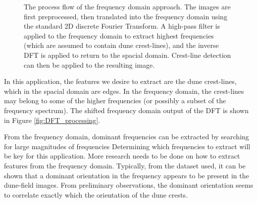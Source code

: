  \begin{figure}[H]
 	\centering
 	\caption{The process flow of the frequency domain approach. The images are first preprocessed, then translated into the frequency domain using the standard 2D discrete Fourier Transform. A high-pass filter is applied to the frequency domain to extract highest frequencies (which are assumed to contain dune crest-lines), and the inverse DFT is applied to return to the spacial domain. Crest-line detection can then be applied to the resulting image. }
 	\label{fig:flow_dft}
 \end{figure}

In this application, the features we desire to extract are the dune crest-lines, which in the spacial domain are edges. In the frequency domain, the crest-lines may belong to some of the higher frequencies (or possibly a subset of the frequency spectrum). The shifted frequency domain output of the DFT is shown in Figure \ref{fig:DFT_processing}.

From the frequency domain, dominant frequencies can be extracted by searching for large magnitudes of frequencies Determining which frequencies to extract will be key for this application. More research needs to be done on how to extract features from the frequency domain. Typically, from the dataset used, it can be shown that a dominant orientation in the frequency appears to be present in the dune-field images. From preliminary observations, the dominant orientation seems to correlate exactly which the orientation of the dune crests.

